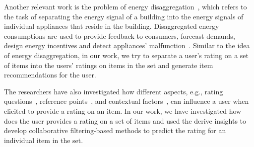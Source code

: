 Another relevant work is the problem of energy disaggregation~\cite{hart1992nonintrusive}, 
which refers to the task
of separating the energy signal of a building into the energy signals of
individual appliances that reside in the building. Disaggregated energy
consumptions are used to provide feedback to consumers,  forecast demands,
design energy incentives and detect appliances'
malfunction~\cite{froehlich2011disaggregated,darby2006effectiveness}. Similar to
the idea of energy disaggregation, in our work, we try to separate a user's rating on a set of
items into the users' ratings on items in the set and generate item
recommendations for the user.

The researchers have also investigated how different aspects, e.g., rating
questions~\cite{bellogin2014magic}, reference
points~\cite{adomavicius2011recommender,cosley2003seeing,nguyen2013rating}, and
contextual factors~\cite{Winoto2010RUM}, can influence a user when
elicited to provide a rating on an item. In our work, we have investigated how
does the user provides a rating on a set of items and used the derive insights to develop
collaborative filtering-based methods to predict the rating for an individual
item in the set.









